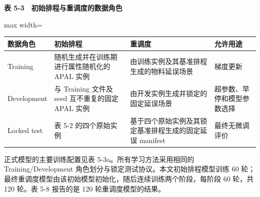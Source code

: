 \documentclass[journal,10pt]{IEEEtran}
\renewcommand{\arraystretch}{1.08}
\begin{document}
\begin{table}[!t]
\centering
\footnotesize
\textbf{表 5-3　初始排程与重调度的数据角色}\par\smallskip
\setlength{\tabcolsep}{3pt}
\renewcommand{\arraystretch}{1.08}
\begin{adjustbox}{max width=\textwidth}
\begin{tabular}{@{}
  >{\raggedright\arraybackslash}p{}
  >{\raggedright\arraybackslash}p{}
  >{\raggedright\arraybackslash}p{}
  >{\raggedright\arraybackslash}p{}@{}}
\toprule
\begin{minipage}[b]{\linewidth}\raggedright
数据角色
\end{minipage} & \begin{minipage}[b]{\linewidth}\raggedright
初始排程
\end{minipage} & \begin{minipage}[b]{\linewidth}\raggedright
重调度
\end{minipage} & \begin{minipage}[b]{\linewidth}\raggedright
允许用途
\end{minipage} \\
\midrule
Training & 随机生成并在训练期进行属性随机化的 APAL 实例 & 由训练实例及其基准排程生成的物料延误场景 & 梯度更新 \\
Development & 与 Training 文件及 seed 互不重复的固定 APAL 实例 & 由开发实例生成并锁定的固定延误场景 & 超参数、早停和模型参数选择 \\
Locked test & 表 5-2 的四个原始实例 & 基于四个原始实例及其锁定基准排程生成的固定延误 manifest & 最终无微调评价 \\
\bottomrule
\end{tabular}
\end{adjustbox}
\end{table}

正式模型的主要训练配置见表 5-3a。所有学习方法采用相同的 Training/Development 角色划分与锁定测试协议。本文初始排程模型训练 60 轮；最终重调度模型由该初始模型初始化，随后连续训练两个阶段，每阶段 60 轮，共 120 轮。表 5-8 报告的是 120 轮重调度模型的结果。
\end{document}
